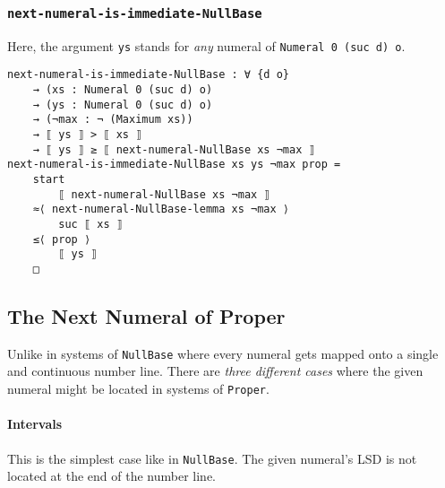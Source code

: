 \documentclass[\main/thesis.tex]{subfiles}
\begin{document}
\subsubsection{{\lstinline|next-numeral-is-immediate-NullBase|}}

Here, the argument {\lstinline|ys|} stands for \textit{any} numeral of {\lstinline|Numeral 0 (suc d) o|}.

\begin{lstlisting}
next-numeral-is-immediate-NullBase : ∀ {d o}
    → (xs : Numeral 0 (suc d) o)
    → (ys : Numeral 0 (suc d) o)
    → (¬max : ¬ (Maximum xs))
    → ⟦ ys ⟧ > ⟦ xs ⟧
    → ⟦ ys ⟧ ≥ ⟦ next-numeral-NullBase xs ¬max ⟧
next-numeral-is-immediate-NullBase xs ys ¬max prop =
    start
        ⟦ next-numeral-NullBase xs ¬max ⟧
    ≈⟨ next-numeral-NullBase-lemma xs ¬max ⟩
        suc ⟦ xs ⟧
    ≤⟨ prop ⟩
        ⟦ ys ⟧
    □
\end{lstlisting}

\subsection{The Next Numeral of Proper}

Unlike in systems of {\lstinline|NullBase|} where every numeral gets mapped onto
a single and continuous number line.
There are \textit{three different cases} where the given numeral might be located
in systems of {\lstinline|Proper|}.

\paragraph{Intervals}

This is the simplest case like in {\lstinline|NullBase|}.
The given numeral's LSD is not located at the end of the number line.
\end{document}
